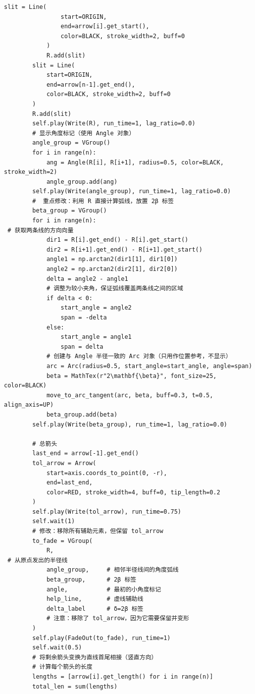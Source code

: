 \documentclass[12pt,a4paper]{ctexrep}
\begin{document}
\begin{lstlisting}[style=pycode]
            slit = Line(
                start=ORIGIN,
                end=arrow[i].get_start(),
                color=BLACK, stroke_width=2, buff=0
            )
            R.add(slit)
        slit = Line(
            start=ORIGIN,
            end=arrow[n-1].get_end(),
            color=BLACK, stroke_width=2, buff=0
        )
        R.add(slit)
        self.play(Write(R), run_time=1, lag_ratio=0.0)
        # 显示角度标记（使用 Angle 对象）
        angle_group = VGroup()
        for i in range(n):
            ang = Angle(R[i], R[i+1], radius=0.5, color=BLACK, stroke_width=2)
            angle_group.add(ang)
        self.play(Write(angle_group), run_time=1, lag_ratio=0.0)
        #  重点修改：利用 R 直接计算弧线，放置 2β 标签
        beta_group = VGroup()
        for i in range(n):
 # 获取两条线的方向向量
            dir1 = R[i].get_end() - R[i].get_start()
            dir2 = R[i+1].get_end() - R[i+1].get_start()
            angle1 = np.arctan2(dir1[1], dir1[0])
            angle2 = np.arctan2(dir2[1], dir2[0])
            delta = angle2 - angle1
            # 调整为较小夹角，保证弧线覆盖两条线之间的区域
            if delta < 0:
                start_angle = angle2
                span = -delta
            else:
                start_angle = angle1
                span = delta
            # 创建与 Angle 半径一致的 Arc 对象（只用作位置参考，不显示）
            arc = Arc(radius=0.5, start_angle=start_angle, angle=span)
            beta = MathTex(r"2\mathbf{\beta}", font_size=25, color=BLACK)
            move_to_arc_tangent(arc, beta, buff=0.3, t=0.5, align_axis=UP)
            beta_group.add(beta)
        self.play(Write(beta_group), run_time=1, lag_ratio=0.0)

        # 总箭头
        last_end = arrow[-1].get_end()
        tol_arrow = Arrow(
            start=axis.coords_to_point(0, -r),
            end=last_end,
            color=RED, stroke_width=4, buff=0, tip_length=0.2
        )
        self.play(Write(tol_arrow), run_time=0.75)
        self.wait(1)
        # 修改：移除所有辅助元素，但保留 tol_arrow
        to_fade = VGroup(
            R,
 # 从原点发出的半径线
            angle_group,     # 相邻半径线间的角度弧线
            beta_group,      # 2β 标签
            angle,           # 最初的小角度标记
            help_line,       # 虚线辅助线
            delta_label      # δ=2β 标签
            # 注意：移除了 tol_arrow，因为它需要保留并变形
        )
        self.play(FadeOut(to_fade), run_time=1)
        self.wait(0.5)
        # 将剩余箭头变换为直线首尾相接（竖直方向）
        # 计算每个箭头的长度
        lengths = [arrow[i].get_length() for i in range(n)]
        total_len = sum(lengths)


\end{lstlisting}
\end{document}
